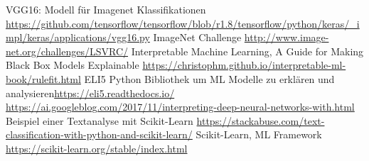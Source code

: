 \documentclass[
  12pt, %
  a4paper, %
  oneside, %
  openany, 
  numbers=noenddot, %
  BCOR=5mm, %
  parskip=half*, %
  thesis, %
]{bfhbook}
\begin{document}
\renewcommand\bibname{Linkverzeichnis}
\begin{thebibliography}{99}\label{links}
    VGG16: Modell für Imagenet Klassifikationen \break \url{https://github.com/tensorflow/tensorflow/blob/r1.8/tensorflow/python/keras/_impl/keras/applications/vgg16.py}
    ImageNet Challenge \break \url{http://www.image-net.org/challenges/LSVRC/}
   Interpretable Machine Learning, A Guide for Making Black Box Models Explainable \break \url{https://christophm.github.io/interpretable-ml-book/rulefit.html}
    ELI5 Python Bibliothek um \Gls{ML} Modelle zu erklären und analysieren\break \url{https://eli5.readthedocs.io/}
    \break \url{https://ai.googleblog.com/2017/11/interpreting-deep-neural-networks-with.html}
   Beispiel einer Textanalyse mit Scikit-Learn \break \url{https://stackabuse.com/text-classification-with-python-and-scikit-learn/}
   Scikit-Learn, \Gls{ML} Framework \break \url{https://scikit-learn.org/stable/index.html}
\end{thebibliography}
\lstlistoflistings
\endgroup
\end{document}
